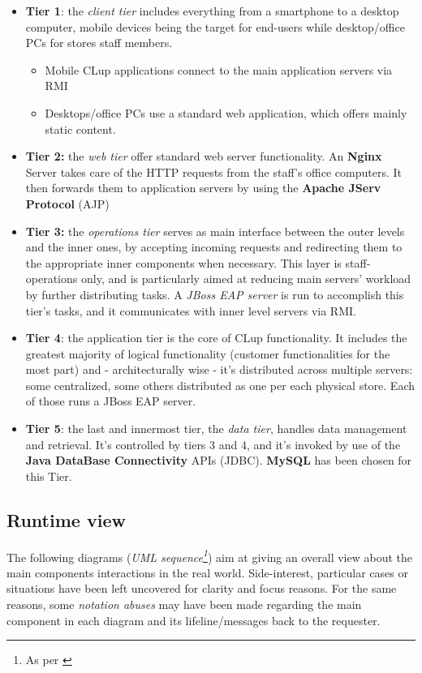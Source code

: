 \begin{itemize}
    \item \textbf{Tier 1}: the \textit{client tier} includes everything from a smartphone to a desktop computer, mobile devices being the target for end-users while desktop/office PCs for stores staff members. 
    \begin{itemize}
        \item Mobile CLup applications connect to the main application servers via RMI
        \item Desktops/office PCs use a standard web application, which offers mainly static content.
    \end{itemize}
    \item \textbf{Tier 2:} the \textit{web tier} offer standard web server functionality. An \textbf{Nginx} Server takes care of the HTTP requests from the staff's office computers. It then forwards them to application servers by using the \textbf{Apache JServ Protocol} (AJP)
    \item \textbf{Tier 3:} the \textit{operations tier} serves as main interface between the outer levels and the inner ones, by accepting incoming requests and redirecting them to the appropriate inner components when necessary. This layer is staff-operations only, and is particularly aimed at reducing main servers' workload by further distributing tasks. A \textit{JBoss EAP server} is run to accomplish this tier's tasks, and it communicates with inner level servers via RMI.
    \item \textbf{Tier 4}: the application tier is the core of CLup functionality. It includes the greatest majority of logical functionality (customer functionalities for the most part) and - architecturally wise - it's distributed across multiple servers: some centralized, some others distributed as one per each physical store. Each of those runs a JBoss EAP server. 
    \item \textbf{Tier 5}: the last and innermost tier, the \textit{data tier}, handles data management and retrieval. It's controlled by tiers 3 and 4, and it's invoked by use of the \textbf{Java DataBase Connectivity} APIs (JDBC). \textbf{MySQL} has been chosen for this Tier.

\end{itemize}

\subsection{Runtime view}
The following diagrams (\textit{UML sequence\footnote{As per \cite{UML:ref}}}) aim at giving an overall view about the main components interactions in the real world. Side-interest, particular cases or situations have been left uncovered for clarity and focus reasons. For the same reasons, some \textit{notation abuses} may have been made regarding the main component in each diagram and its lifeline/messages back to the requester.\newline


